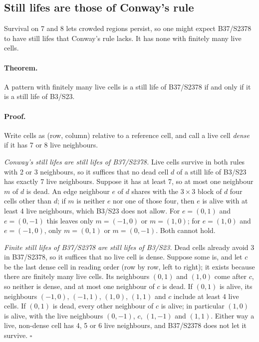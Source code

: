\documentclass[11pt,a4paper]{article}
\begin{document}
\subsection{Still lifes are those of Conway's rule}

Survival on 7 and 8 lets crowded regions persist, so one might expect B37/S2378 to have
still lifes that Conway's rule lacks. It has none with finitely many live cells.

\paragraph{Theorem.} A pattern with finitely many live cells is a still life of B37/S2378
if and only if it is a still life of B3/S23.

\paragraph{Proof.} Write cells as (row, column) relative to a reference cell, and call a
live cell \emph{dense} if it has 7 or 8 live neighbours.

\emph{Conway's still lifes are still lifes of B37/S2378.} Live cells survive in both rules
with 2 or 3 neighbours, so it suffices that no dead cell $d$ of a still life of B3/S23 has
exactly 7 live neighbours. Suppose it has at least 7, so at most one neighbour $m$ of $d$ is
dead. An edge neighbour $e$ of $d$ shares with the $3\times3$ block of $d$ four cells other
than $d$; if $m$ is neither $e$ nor one of those four, then $e$ is alive with at least 4 live
neighbours, which B3/S23 does not allow. For $e=(0,1)$ and $e=(0,-1)$ this leaves only
$m=(-1,0)$ or $m=(1,0)$; for $e=(1,0)$ and $e=(-1,0)$, only $m=(0,1)$ or $m=(0,-1)$. Both
cannot hold.

\emph{Finite still lifes of B37/S2378 are still lifes of B3/S23.} Dead cells already avoid
3 in B37/S2378, so it suffices that no live cell is dense. Suppose some is, and let $c$ be
the last dense cell in reading order (row by row, left to right); it exists because there
are finitely many live cells. Its neighbours $(0,1)$ and $(1,0)$ come after $c$, so neither
is dense, and at most one neighbour of $c$ is dead. If $(0,1)$ is alive, its neighbours
$(-1,0)$, $(-1,1)$, $(1,0)$, $(1,1)$ and $c$ include at least 4 live cells. If $(0,1)$ is
dead, every other neighbour of $c$ is alive; in particular $(1,0)$ is alive, with the live
neighbours $(0,-1)$, $c$, $(1,-1)$ and $(1,1)$. Either way a live, non-dense cell has 4, 5 or 6 live neighbours,
and B37/S2378 does not let it survive. \hfill$\square$
\end{document}
